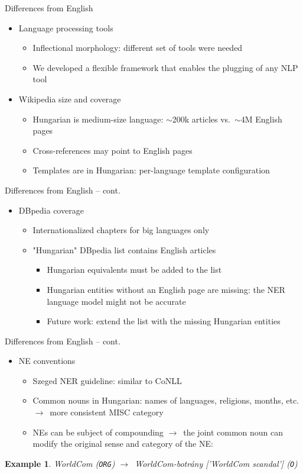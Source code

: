 \documentclass[utf8x,t]{beamer}
\newcommand{\vitem}{\item \vspace{4pt}}
\newcommand{\nyil}{$\rightarrow$\ }
\newcommand{\nagytilde}{$\sim$}
\newtheorem{Examplee}{Example}[section]
\begin{document}
\begin{frame}{Differences from English}
  \bigskip
  \begin{itemize}
  \vitem Language processing tools
    \begin{itemize}
    \vitem Inflectional morphology: different set of tools were needed 
    \vitem We developed a flexible framework that enables the plugging of any NLP tool
    \end{itemize}
  \vitem Wikipedia size and coverage
    \begin{itemize}
    \vitem Hungarian is medium-size language: \nagytilde 200k articles vs.~\nagytilde 4M English pages
    \vitem Cross-references may point to English pages
    \vitem Templates are in Hungarian: per-language template configuration
    \end{itemize}
  \end{itemize}
\end{frame}

\begin{frame}{Differences from English -- cont.}
  \bigskip
  \begin{itemize}
  \vitem DBpedia coverage
    \smallskip
    \begin{itemize}
    \vitem Internationalized chapters for big languages only
    \vitem "Hungarian" DBpedia list contains English articles %
      \begin{itemize}
      \vitem Hungarian equivalents must be added to the list %
      \vitem Hungarian entities without an English page are missing:
             the NER language model might not be accurate
      \vitem Future work: extend the list with the missing Hungarian entities
      \end{itemize}
    \end{itemize}
  \end{itemize}
\end{frame}

\begin{frame}{Differences from English -- cont.}
  \bigskip
  \begin{itemize}
  \vitem NE conventions
    \smallskip
    \begin{itemize}
    \vitem Szeged NER guideline: similar to CoNLL
    \vitem Common nouns in Hungarian: names of languages, religions, months, etc. \nyil more consistent MISC category
    \vitem NEs can be subject of compounding \nyil the joint common noun can modify the original sense and category of the NE:
    \end{itemize}
  \end{itemize}
  \bigskip
  \begin{Examplee}
  \small{WorldCom {\normalfont(\texttt{ORG})} \nyil WorldCom-botrány ['WorldCom scandal'] {\normalfont(\texttt{O})}}
  \end{Examplee}
\end{frame}
\end{document}

